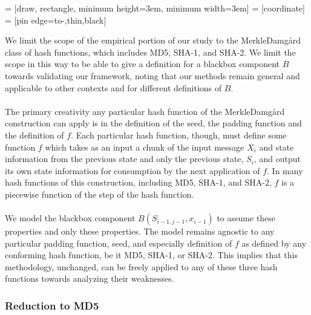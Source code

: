 \documentclass[letterpaper,twocolumn,10pt]{article}
\begin{document}
 = [draw, rectangle, minimum height=3em, minimum width=3em]
 = [coordinate]
 = [pin edge={to-,thin,black}]
\begin{center}
\end{center}

 
We limit the scope of the empirical portion of our study to the Merkle{\textendash}Damg\r{a}rd class of hash functions, which includes MD5, SHA-1, and SHA-2. We limit the scope in this way to be able to give a definition for a blackbox component $B$ towards validating our framework, noting that our methods remain general and applicable to other contexts and for different definitions of $B$. 
\\
\\
The primary creativity any particular hash function of the Merkle{\textendash}Damg\r{a}rd construction can apply is in the definition of the seed, the padding function and the definition of $f$. Each particular hash function, though, must define some function $f$ which takes as an input a chunk of the input message $X_i$ and state information from the previous state and only the previous state, $S_i$, and output its own state information for consumption by the next application of $f$. In many hash functions of this construction, including MD5, SHA-1, and SHA-2, $f$ is a piecewise function of the step of the hash function.  
\\
\\
We model the blackbox component $B(S_{i-1,j-1}, x_{i-1})$ to assume these properties and only these properties. The model remains agnostic to any particular padding function, seed, and especially definition of $f$ as defined by any conforming hash function, be it MD5, SHA-1, or SHA-2. This implies that this methodology, unchanged, can be freely applied to any of these three hash functions towards analyzing their weaknesses. 

\subsubsection{Reduction to MD5} \label{sec:reducmd5}
\end{document}
